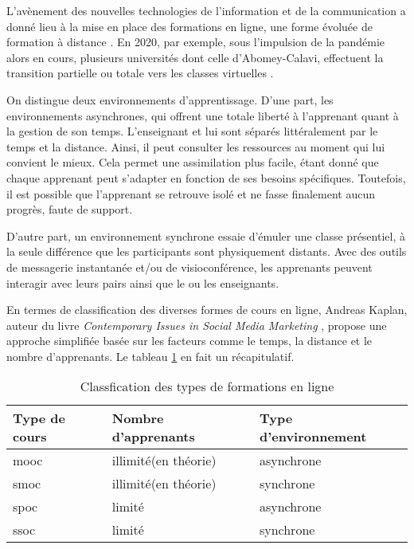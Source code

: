 L'avènement des nouvelles technologies de l’information et de la communication 
a donné lieu à la mise en place des formations en ligne, 
une forme évoluée de formation à distance \cite{online_learning}. 
En 2020, par exemple, sous l’impulsion de la pandémie alors en cours, 
plusieurs universités dont celle d’Abomey-Calavi, 
effectuent la transition partielle ou totale vers les classes virtuelles \cite{etudiant_dot_bj}.

On distingue deux environnements d’apprentissage. 
D’une part, les environnements asynchrones, qui offrent une totale liberté à l'apprenant quant à la gestion de son temps. 
L’enseignant et lui sont séparés littéralement par le temps et la distance. Ainsi, il peut consulter les ressources au moment qui lui convient le mieux. 
Cela permet une assimilation plus facile, étant donné que chaque apprenant peut s’adapter en fonction de ses besoins spécifiques. 
Toutefois, il est possible que l’apprenant se retrouve isolé et ne fasse finalement aucun progrès, faute de support.

D’autre part, un environnement synchrone essaie d'émuler une classe présentiel, 
à la seule différence que les participants sont physiquement distants. 
Avec des outils de messagerie instantanée et/ou de visioconférence, 
les apprenants peuvent interagir avec leurs pairs ainsi que le ou les enseignants.

En termes de classification des diverses formes de cours en ligne, Andreas Kaplan, 
auteur du livre \textit{Contemporary Issues in Social Media Marketing} \cite{andreas_kaplan_classfication}, propose une approche simplifiée basée sur les facteurs 
comme le temps, la distance et le nombre d’apprenants. 
Le tableau \ref{course_classification} en fait un récapitulatif.

\begin{table}[H]
  \centering
\begin{tabular}{|l|l|l|}
  \hline
  Type de cours &  Nombre d’apprenants &  Type d’environnement \\
  \hline
  \acrfull{mooc} & illimité(en théorie) & asynchrone \\
  \hline
  \acrfull{smoc} & illimité(en théorie) & synchrone \\
  \hline
  \acrfull{spoc} & limité & asynchrone \\
  \hline
  \acrfull{ssoc} & limité & synchrone \\
  \hline
\end{tabular}
\caption{Classfication des types de formations en ligne}
\label{course_classification}
\end{table}

